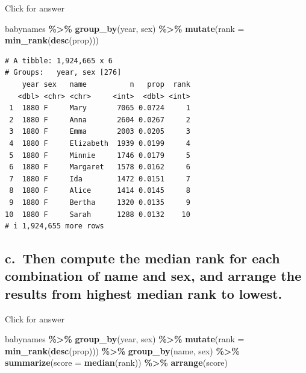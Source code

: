 \documentclass[
]{book}
\newenvironment{Shaded}{\begin{snugshade}}{\end{snugshade}}
\newcommand{\AttributeTok}[1]{\textcolor[rgb]{0.13,0.29,0.53}{#1}}
\newcommand{\FunctionTok}[1]{\textcolor[rgb]{0.13,0.29,0.53}{\textbf{#1}}}
\newcommand{\NormalTok}[1]{#1}
\newcommand{\SpecialCharTok}[1]{\textcolor[rgb]{0.81,0.36,0.00}{\textbf{#1}}}
\begin{document}
Click for answer

\begin{Shaded}
\begin{Highlighting}[]
\NormalTok{babynames }\SpecialCharTok{\%\textgreater{}\%} \FunctionTok{group\_by}\NormalTok{(year, sex) }\SpecialCharTok{\%\textgreater{}\%} \FunctionTok{mutate}\NormalTok{(}\AttributeTok{rank =} \FunctionTok{min\_rank}\NormalTok{(}\FunctionTok{desc}\NormalTok{(prop)))}
\end{Highlighting}
\end{Shaded}

\begin{verbatim}
# A tibble: 1,924,665 x 6
# Groups:   year, sex [276]
    year sex   name          n   prop  rank
   <dbl> <chr> <chr>     <int>  <dbl> <int>
 1  1880 F     Mary       7065 0.0724     1
 2  1880 F     Anna       2604 0.0267     2
 3  1880 F     Emma       2003 0.0205     3
 4  1880 F     Elizabeth  1939 0.0199     4
 5  1880 F     Minnie     1746 0.0179     5
 6  1880 F     Margaret   1578 0.0162     6
 7  1880 F     Ida        1472 0.0151     7
 8  1880 F     Alice      1414 0.0145     8
 9  1880 F     Bertha     1320 0.0135     9
10  1880 F     Sarah      1288 0.0132    10
# i 1,924,655 more rows
\end{verbatim}

\hypertarget{c.-then-compute-the-median-rank-for-each-combination-of-name-and-sex-and-arrange-the-results-from-highest-median-rank-to-lowest.}{%
\subsection{c.~Then compute the median rank for each combination of name and sex, and arrange the results from highest median rank to lowest.}\label{c.-then-compute-the-median-rank-for-each-combination-of-name-and-sex-and-arrange-the-results-from-highest-median-rank-to-lowest.}}

Click for answer

\begin{Shaded}
\begin{Highlighting}[]
\NormalTok{babynames }\SpecialCharTok{\%\textgreater{}\%} 
  \FunctionTok{group\_by}\NormalTok{(year, sex) }\SpecialCharTok{\%\textgreater{}\%} 
  \FunctionTok{mutate}\NormalTok{(}\AttributeTok{rank =} \FunctionTok{min\_rank}\NormalTok{(}\FunctionTok{desc}\NormalTok{(prop))) }\SpecialCharTok{\%\textgreater{}\%}
  \FunctionTok{group\_by}\NormalTok{(name, sex) }\SpecialCharTok{\%\textgreater{}\%}
  \FunctionTok{summarize}\NormalTok{(}\AttributeTok{score =} \FunctionTok{median}\NormalTok{(rank)) }\SpecialCharTok{\%\textgreater{}\%}
  \FunctionTok{arrange}\NormalTok{(score) }
\end{Highlighting}
\end{Shaded}
\end{document}
